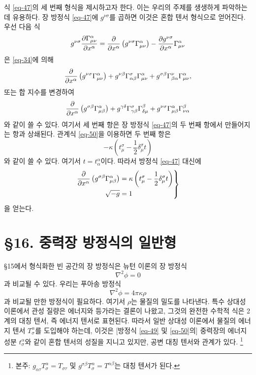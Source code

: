 \documentclass[b5paper]{article}
\begin{document}
식 \eqref{eq-47}의 세 번째 형식을 제시하고자 한다. 이는 우리의 주제를 생생하게 파악하는 데 유용하다. 장 방정식 \eqref{eq-47}에 $g^{\nu\sigma}$를 곱하면 이것은 혼합 텐서 형식으로 얻어진다. 우선 다음 식
\begin{equation*}
	g^{\nu\sigma} {\frac{{\partial}{\Gamma_{\mu\nu}^{\alpha}}}{{\partial}{x^\alpha}}}
	= {\frac{{\partial}{}}{{\partial}{x^\alpha}}} \left( g^{\nu\sigma} \Gamma_{\mu\nu}^{\alpha} \right)
	- {\frac{{\partial}{g^{\nu\sigma}}}{{\partial}{x^\alpha}}} \Gamma_{\mu\nu}^{\alpha}
\end{equation*}
은 \eqref{eq-34}에 의해
\begin{equation*}
	{\frac{{\partial}{}}{{\partial}{x^\alpha}}} \left( g^{\nu\sigma} \Gamma_{\mu\nu}^{\alpha} \right)
	+ g^{\nu\beta} \Gamma_{\alpha\beta}^{\sigma} \Gamma_{\mu\nu}^{\alpha}
	+ g^{\sigma\beta} \Gamma_{\beta\alpha}^{\nu} \Gamma_{\mu\nu}^{\alpha},
\end{equation*}
또는 합 지수를 변경하여
\begin{equation*}
{\frac{{\partial}{}}{{\partial}{x^\alpha}}} \left( g^{\sigma\beta} \Gamma_{\mu\beta}^{\alpha} \right)
+ g^{\gamma\delta} \Gamma_{\gamma\beta}^{\sigma} \Gamma_{\delta\mu}^{\beta}
+ g^{\nu\sigma} \Gamma_{\mu\beta}^{\alpha} \Gamma_{\nu\alpha}^{\beta}
\end{equation*}
와 같이 쓸 수 있다. 여기서 세 번째 항은 장 방정식 \eqref{eq-47}의 두 번째 항에서 만들어지는 항과 상쇄된다. 관계식 \eqref{eq-50}을 이용하면 두 번째 항은
\begin{equation*}
-\kappa\left(t_\mu^\sigma - \frac{1}{2} \delta_\mu^\sigma t\right)
\end{equation*}
와 같이 쓸 수 있다. 여기서 $t=t_\alpha^\alpha$이다. 따라서  방정식 \eqref{eq-47} 대신에
\begin{equation} \label{eq-51}
	\left.
	\begin{aligned}
	{\frac{{\partial}{}}{{\partial}{x^\alpha}}} \left( g^{\sigma\beta} \Gamma_{\mu\beta}^{\alpha} \right)
	&= \kappa\left(t_\mu^\sigma - \frac{1}{2} \delta_\mu^\sigma t\right)\\
	\sqrt{-g} &= 1
	\end{aligned}
	\right\}
\end{equation}
을 얻는다.
\section*{\S 16. 중력장 방정식의 일반형}
\S15에서 형식화한 빈 공간의 장 방정식은 뉴턴 이론의 장 방정식
\begin{equation*}
	\nabla^2\phi=0
\end{equation*}
과 비교될 수 있다. 우리는 푸아송 방정식
\begin{equation*}
\nabla^2\phi=4\pi\kappa\rho
\end{equation*}
과 비교될 만한 방정식이 필요하다. 여기서 $\rho$는 물질의 밀도를 나타낸다.
특수 상대성 이론에서 관성 질량은 에너지와 등가라는 결론이 나왔고, 그것의 완전한 수학적 식은 2계의 대칭 텐서, 즉 에너지 텐서로 표현된다. 따라서 일반 상대성 이론에서 물질의 에너지 텐서 $T_\sigma^\alpha$를 도입해야 하는데, 이것은 [방정식 \eqref{eq-49} 및 \eqref{eq-50}의] 중력장의 에너지 성분 $t_\sigma^\alpha$와 같이 혼합 텐서의 성질을 지니고 있지만, 공변 대칭 텐서와 관계가 있다. \footnote{본주: $g_{\alpha\tau}T_\sigma^\alpha=T_{\sigma\tau}$ 및 $g^{\sigma\beta}T_\sigma^\alpha=T^{\alpha\beta}$는 대칭 텐서가 된다.}
\end{document}
